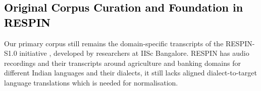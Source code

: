 \subsection{\textcolor{black}{Original Corpus Curation and Foundation in RESPIN}}

Our primary corpus still remains the domain-specific transcripts of the RESPIN-S1.0 initiative \cite{kumar2025respin}, developed by researchers at IISc Bangalore.
RESPIN has audio recordings and their transcripts around agriculture and banking domains for different Indian languages and their dialects, 
it still lacks aligned dialect-to-target language translations which is needed for normalisation.


